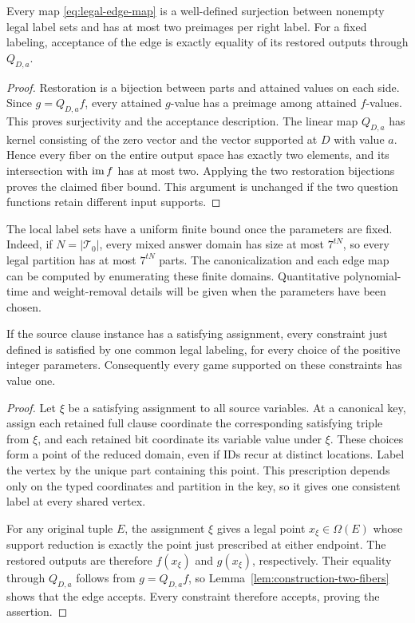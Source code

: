 \begin{lemma}\label{lem:construction-two-fibers}
Every map \eqref{eq:legal-edge-map} is a well-defined surjection between
nonempty legal label sets and has at most two preimages per right label.
For a fixed labeling, acceptance of the edge is exactly equality of its
restored outputs through $Q_{D,a}$.
\end{lemma}
\begin{proof}
Restoration is a bijection between parts and attained values on each
side.  Since $g=Q_{D,a}f$, every attained $g$-value has a preimage
among attained $f$-values.  This proves surjectivity and the acceptance
description.  The linear map $Q_{D,a}$ has kernel consisting of the
zero vector and the vector supported at $D$ with value $a$.
Hence every fiber on the entire output space has exactly two elements,
and its intersection with $\operatorname{im} f$ has at most two.
Applying the two restoration bijections proves the claimed fiber bound.
This argument is unchanged if the two question functions retain
different input supports.
\end{proof}

The local label sets have a uniform finite bound once the parameters are
fixed.  Indeed, if $N=|\mathcal T_0|$, every mixed answer domain has size at
most $7^{tN}$, so every legal partition has at most $7^{tN}$ parts.
The canonicalization and each edge map can be computed by enumerating
these finite domains.  Quantitative polynomial-time and weight-removal
details will be given when the parameters have been chosen.

\begin{proposition}\label{prop:completeness}
If the source clause instance has a satisfying assignment, every constraint
just defined is satisfied by one common legal labeling, for every choice
of the positive integer parameters.  Consequently every game supported on
these constraints has value one.
\end{proposition}
\begin{proof}
Let $\xi$ be a satisfying assignment to all source variables.
At a canonical key, assign each retained full clause coordinate the
corresponding satisfying triple from $\xi$, and each retained bit
coordinate its variable value under $\xi$.  These choices form a point
of the reduced domain, even if IDs recur at distinct locations.
Label the vertex by the unique part containing this point.
This prescription depends only on the typed coordinates and partition
in the key, so it gives one consistent label at every shared vertex.

For any original tuple $E$, the assignment $\xi$ gives a legal
point $x_\xi\in\Omega(E)$ whose support reduction is exactly the point
just prescribed at either endpoint.  The restored outputs are therefore
$f(x_\xi)$ and $g(x_\xi)$, respectively.  Their equality through
$Q_{D,a}$ follows from $g=Q_{D,a}f$, so
Lemma~\ref{lem:construction-two-fibers} shows that the edge accepts.
Every constraint therefore accepts, proving the assertion.
\end{proof}

